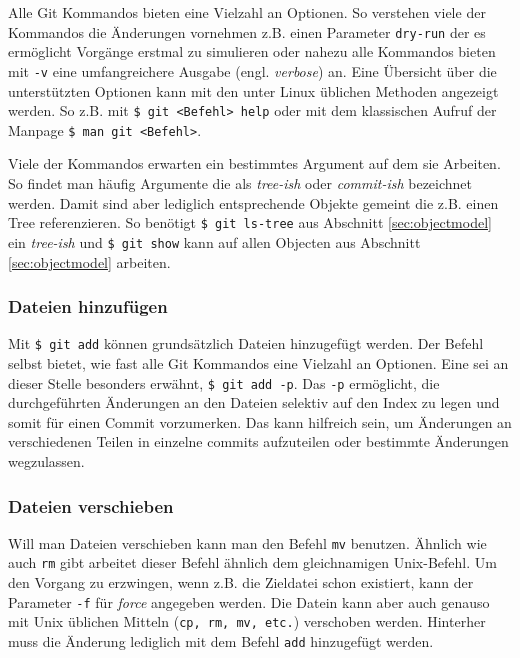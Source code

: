 Alle Git Kommandos bieten eine Vielzahl an Optionen. So verstehen viele der
Kommandos die Änderungen vornehmen z.B. einen Parameter \texttt{dry-run} der es
ermöglicht Vorgänge erstmal zu simulieren oder nahezu alle Kommandos bieten mit
\texttt{-v} eine umfangreichere Ausgabe (engl. \textit{verbose}) an. Eine
Übersicht über die unterstützten Optionen kann mit den unter Linux üblichen
Methoden angezeigt werden. So z.B. mit \texttt{\$ git <Befehl> help} oder mit
dem klassischen Aufruf der Manpage \texttt{\$ man git <Befehl>}.

Viele der Kommandos erwarten ein bestimmtes Argument auf dem sie Arbeiten. So
findet man häufig Argumente die als \textit{tree-ish} oder \textit{commit-ish}
bezeichnet werden. Damit sind aber lediglich entsprechende Objekte gemeint die
z.B. einen Tree referenzieren.\cite[52]{gitosp} So benötigt \texttt{\$ git
ls-tree} aus Abschnitt \ref{sec:objectmodel} ein \textit{tree-ish} und
\texttt{\$ git show} kann auf allen Objecten aus Abschnitt
\ref{sec:objectmodel} arbeiten.

\subsubsection{Dateien hinzufügen}\label{sec:gitadd}
Mit \texttt{\$ git add} können grundsätzlich Dateien hinzugefügt werden. Der
Befehl selbst bietet, wie fast alle Git Kommandos eine Vielzahl an Optionen.
Eine sei an dieser Stelle besonders erwähnt, \texttt{\$ git add -p}. Das
\texttt{-p} ermöglicht, die durchgeführten Änderungen an den Dateien selektiv
auf den Index zu legen und somit für einen Commit vorzumerken. Das kann
hilfreich sein, um Änderungen an verschiedenen Teilen in einzelne
\glspl{commit} aufzuteilen oder bestimmte Änderungen
wegzulassen.\cite[S.~36-37]{gitosp}

\subsubsection{Dateien verschieben} Will man Dateien verschieben kann man den Befehl
\texttt{mv} benutzen. Ähnlich wie auch \texttt{rm} gibt arbeitet dieser Befehl
ähnlich dem gleichnamigen Unix-Befehl. Um den Vorgang zu erzwingen, wenn z.B.
die Zieldatei schon existiert, kann der Parameter \texttt{-f} für
\textit{force} angegeben werden.  Die Datein kann aber auch genauso mit Unix
üblichen Mitteln (\texttt{cp, rm, mv, etc.}) verschoben werden. Hinterher muss
die Änderung lediglich mit dem Befehl \texttt{add} hinzugefügt
werden.\cite[S.~43-44]{gitosp}

